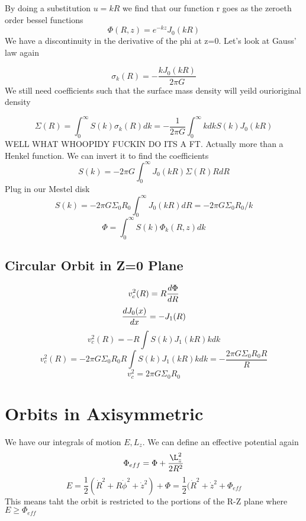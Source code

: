 By doing a substitution $u = kR$ we find that our function r goes as the zeroeth order bessel functions
\begin{equation}
\Phi(R,z) = e^{-kz} J_0(kR)
\end{equation}
We have a discontinuity in the derivative of the phi at z=0. Let's look at Gauss' law again

\begin{equation}
\sigma_k(R) = -\frac{k J_0(kR)}{2\pi G}
\end{equation}
We still need coefficients such that the surface mass density will yeild ourioriginal density

\begin{equation}
\Sigma(R) = \int_0^{\infty} S(k) \sigma_k(R) dk = -\frac{1}{2\pi G}\int_0^{\infty} kdk S(k)J_0(kR)
\end{equation}
WELL WHAT WHOOPIDY FUCKIN DO ITS A FT. Actually more than a Henkel function. We can invert it to find the coefficients
\begin{equation}
S(k) = -2\pi G \int_0^{\infty} J_0(kR) \Sigma(R) RdR
\end{equation}
Plug in our Mestel disk
\begin{equation}
S(k) = -2\pi G \Sigma_0 R_0 \int_0^{\infty} J_0(kR)  dR = -2\pi G \Sigma_0 R_0 /k
\end{equation}
\begin{equation}
\Phi = \int_0^{\infty} S(k) \Phi_k (R, z)dk
\end{equation}
\subsection{Circular Orbit in Z=0 Plane}
\begin{equation}
v_c^2(R) = R\frac{d \Phi}{d R}
\end{equation}
\begin{equation}
\frac{d J_0(x)}{d x} = -J_1(R)
\end{equation}
\begin{equation}
v^2_c(R) = -R\int S(k) J_1(kR)kdk
\end{equation}
\begin{equation}
v^2_c(R) = -2\pi G \Sigma_0 R_0R\int S(k) J_1(kR)kdk = -\frac{2\pi G \Sigma_0 R_0R}{R}
\end{equation}
\begin{equation}
v_c^2 = 2\pi G \Sigma_0R_0
\end{equation}


\section{Orbits in Axisymmetric}
We have our integrals of motion $E, L_z$. We can define an effective potential again
\begin{equation}
\Phi_{eff} = \Phi + \frac{\L_z^2}{2R^2}
\end{equation}
\begin{equation}
E = \frac{1}{2} (\dot{R}^2 + R\dot{\phi}^2 + \dot{z}^2) + \Phi = \frac{1}{2} (\dot{R}^2 + \dot{z}^2 + \Phi_{eff}
\end{equation}
This means taht the orbit is restricted to the portions of the R-Z plane where $E\ge \Phi_{eff}$

